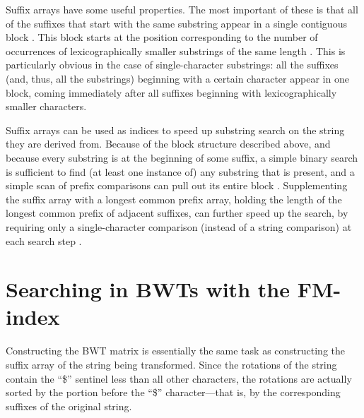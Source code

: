 \documentclass[11pt,proposal]{ucthesis}
\begin{document}
Suffix arrays have some useful properties. The most important of these is that all of the suffixes that start with the same substring appear in a single contiguous block \cite{ferragina2000opportunistic}. This block starts at the position corresponding to the number of occurrences of lexicographically smaller substrings of the same length \cite{ferragina2000opportunistic}. This is particularly obvious in the case of single-character substrings: all the suffixes (and, thus, all the substrings) beginning with a certain character appear in one block, coming immediately after all suffixes beginning with lexicographically smaller characters.

Suffix arrays can be used as indices to speed up substring search on the string they are derived from. Because of the block structure described above, and because every substring is at the beginning of some suffix, a simple binary search is sufficient to find (at least one instance of) any substring that is present, and a simple scan of prefix comparisons can pull out its entire block \cite{manber1993suffix}. Supplementing the suffix array with a longest common prefix array, holding the length of the longest common prefix of adjacent suffixes, can further speed up the search, by requiring only a single-character comparison (instead of a string comparison) at each search step \cite{manber1993suffix}.



    
    
    
\section{Searching in BWTs with the FM-index}

Constructing the BWT matrix is essentially the same task as constructing the suffix array of the string being transformed. Since the rotations of the string contain the ``\$'' sentinel less than all other characters, the rotations are actually sorted by the portion before the ``\$'' character---that is, by the corresponding suffixes of the original string. 
\end{document}
